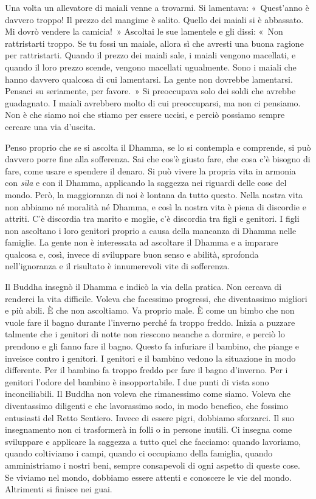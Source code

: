 Una volta un allevatore di maiali venne a trovarmi. Si lamentava:
«~Quest'anno è davvero troppo! Il prezzo del mangime è salito. Quello
dei maiali si è abbassato. Mi dovrò vendere la camicia!~» Ascoltai le
sue lamentele e gli dissi: «~Non rattristarti troppo. Se tu fossi un
maiale, allora sì che avresti una buona ragione per rattristarti. Quando
il prezzo dei maiali sale, i maiali vengono macellati, e quando il loro
prezzo scende, vengono macellati ugualmente. Sono i maiali che hanno
davvero qualcosa di cui lamentarsi. La gente non dovrebbe lamentarsi.
Pensaci su seriamente, per favore.~» Si preoccupava solo dei soldi che
avrebbe guadagnato. I maiali avrebbero molto di cui preoccuparsi, ma non
ci pensiamo. Non è che siamo noi che stiamo per essere uccisi, e perciò
possiamo sempre cercare una via d'uscita.

Penso proprio che se si ascolta il Dhamma, se lo si contempla e
comprende, si può davvero porre fine alla sofferenza. Sai che cos'è
giusto fare, che cosa c'è bisogno di fare, come usare e spendere il
denaro. Si può vivere la propria vita in armonia con \emph{sīla} e con
il Dhamma, applicando la saggezza nei riguardi delle cose del mondo.
Però, la maggioranza di noi è lontana da tutto questo. Nella nostra vita
non abbiamo né moralità né Dhamma, e così la nostra vita è piena di
discordie e attriti. C'è discordia tra marito e moglie, c'è discordia
tra figli e genitori. I figli non ascoltano i loro genitori proprio a
causa della mancanza di Dhamma nelle famiglie. La gente non è
interessata ad ascoltare il Dhamma e a imparare qualcosa e, così, invece
di sviluppare buon senso e abilità, sprofonda nell'ignoranza e il
risultato è innumerevoli vite di sofferenza.

Il Buddha insegnò il Dhamma e indicò la via della pratica. Non cercava
di renderci la vita difficile. Voleva che facessimo progressi, che
diventassimo migliori e più abili. È che non ascoltiamo. Va proprio
male. È come un bimbo che non vuole fare il bagno durante l'inverno
perché fa troppo freddo. Inizia a puzzare talmente che i genitori di
notte non riescono neanche a dormire, e perciò lo prendono e gli fanno
fare il bagno. Questo fa infuriare il bambino, che piange e inveisce
contro i genitori. I genitori e il bambino vedono la situazione in modo
differente. Per il bambino fa troppo freddo per fare il bagno d'inverno.
Per i genitori l'odore del bambino è insopportabile. I due punti di
vista sono inconciliabili. Il Buddha non voleva che rimanessimo come
siamo. Voleva che diventassimo diligenti e che lavorassimo sodo, in modo
benefico, che fossimo entusiasti del Retto Sentiero. Invece di essere
pigri, dobbiamo sforzarci. Il suo insegnamento non ci trasformerà in
folli o in persone inutili. Ci insegna come sviluppare e applicare la
saggezza a tutto quel che facciamo: quando lavoriamo, quando coltiviamo
i campi, quando ci occupiamo della famiglia, quando amministriamo i
nostri beni, sempre consapevoli di ogni aspetto di queste cose. Se
viviamo nel mondo, dobbiamo essere attenti e conoscere le vie del mondo.
Altrimenti si finisce nei guai.

